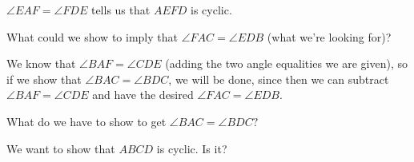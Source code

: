 

$\angle EAF = \angle FDE$ tells us that $AEFD$ is cyclic.

What could we show to imply that $\angle FAC = \angle EDB$ (what we're looking for)?










We know that $\angle BAF = \angle CDE$ (adding the two angle equalities we are given), so if we show that $\angle BAC = \angle BDC$, we will be done, since then we can subtract $\angle BAF = \angle CDE$ and have the desired $\angle FAC = \angle EDB$.

What do we have to show to get $\angle BAC = \angle BDC?$

We want to show that $ABCD$ is cyclic. Is it?





